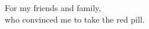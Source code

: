 \clearpage
\vspace*{\fill}
\begin{center}
\begingroup
\fontsize{14pt}{11pt}\selectfont
For my friends and family, \\
who convinced me to take the red pill.
\endgroup
\end{center}
\vfill %
\clearpage